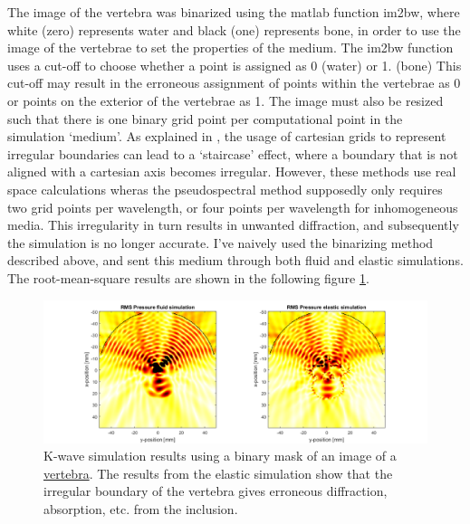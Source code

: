 \documentclass[10pt,a4paper]{article}
\begin{document}
The image of the vertebra was binarized using the matlab function im2bw, where white (zero) represents water and black (one) represents bone, in order to use the image of the vertebrae to set the properties of the medium. The im2bw function uses a cut-off to choose whether a point is assigned as 0 (water) or 1. (bone) This cut-off may result in the erroneous assignment of points within the vertebrae as 0 or points on the exterior of the vertebrae as 1. The image must also be resized such that there is one binary grid point per computational point in the simulation `medium'. As explained in \cite{muir1992modeling,vafaeian2014finite}, the usage of cartesian grids to represent irregular boundaries can lead to a `staircase' effect, where a boundary that is not aligned with a cartesian axis becomes irregular. However, these methods use real space calculations wheras the pseudospectral method supposedly only requires two grid points per wavelength, or four points per wavelength for inhomogeneous media. This irregularity in turn results in unwanted diffraction, and subsequently the simulation is no longer accurate. I've naively used the binarizing method described above, and sent this medium through both fluid and elastic simulations. The root-mean-square results are shown in the following figure \ref{fluidvselastic_vertebrae_rms}.

\begin{figure}[H]\label{fluidvselastic_vertebrae_rms}
\hspace*{-4cm}
\includegraphics[scale=0.7]{fluidvselastic_vertebrae_rms}
\caption{K-wave simulation results using a binary mask of an image of a \href{https://www.cedars-sinai.edu/Patients/Programs-and-Services/Spine-Center/The-Patient-Guide/Anatomy-of-the-Spine/Vertebrae-of-the-Spine.aspx}{vertebra}. The results from the elastic simulation show that the irregular boundary of the vertebra gives erroneous diffraction, absorption, etc. from the inclusion. }
\end{figure} 



\newpage
{}

\end{document}

